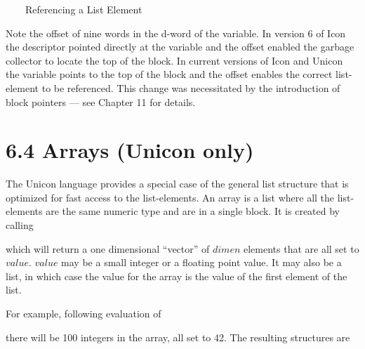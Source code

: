 \ \ \ \ Referencing a List Element

Note the offset of nine words in the d-word of the variable.  In version 6 of
Icon the descriptor pointed directly at the variable and the offset enabled the
garbage collector to locate the top of the block. In current versions of Icon
and Unicon the variable points to the top of the block and the offset enables
the correct list-element to be referenced. This change was necessitated by the
introduction of block pointers --- see Chapter 11 for details.

\section[6.4 Arrays (Unicon only)]{6.4 Arrays (Unicon only)}

The Unicon language provides a special case of the general list structure
that is optimized for fast access to the list-elements. An array is a list
where all the list-elements are the same numeric type and are in a single
block. It is created by calling


\noindent which will return a one dimensional ``vector'' of $dimen$
elements that are all set to $value$.  $value$ may be a small integer or
a floating point value. It may also be a list, in which case the value for
the array is the value of the first element of the list.


For example, following evaluation of


\noindent 
there will be 100 integers in the array, all set to 42.
The resulting structures are

